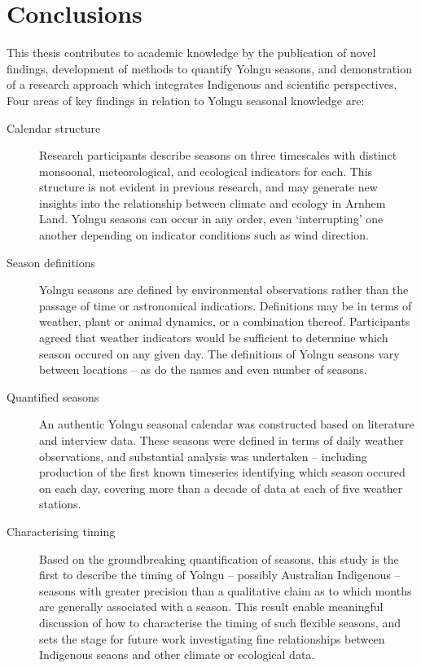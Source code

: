\chapter{Conclusions}
\label{ch:conclusion}

This thesis contributes to academic knowledge by the publication of novel
findings, development of methods to quantify Yolngu seasons, and demonstration
of a research approach which integrates Indigenous and scientific perspectives.
%
Four areas of key findings in relation to Yolngu seasonal knowledge are:

\begin{description}
\item[Calendar structure]
    Research participants describe seasons on three timescales with distinct
    monsoonal, meteorological, and ecological indicators for each.  This
    structure is not evident in previous research, and may generate new
    insights into the relationship between climate and ecology in Arnhem Land.
    Yolngu seasons can occur in any order, even `interrupting' one another
    depending on indicator conditions such as wind direction.

\item[Season definitions]
    Yolngu seasons are defined by environmental observations rather than the
    passage of time or astronomical indicatiors.  Definitions may be in terms
    of weather, plant or animal dynamics, or a combination thereof.
    Participants agreed that weather indicators would be sufficient to
    determine which season occured on any given day.  The definitions of
    Yolngu seasons vary between locations -- as do the names and even number
    of seasons.

\item[Quantified seasons]
    An authentic Yolngu seasonal calendar was constructed based on literature
    and interview data.  These seasons were defined in terms of daily weather
    observations, and substantial analysis was undertaken -- including
    production of the first known timeseries identifying which season occured
    on each day, covering more than a decade of data at each of five weather
    stations.

\item[Characterising timing]
    Based on the groundbreaking quantification of seasons, this study is the
    first to describe the timing of Yolngu -- possibly Australian Indigenous --
    seasons with greater precision than a qualitative claim as to which months
    are generally associated with a season.  This result enable meaningful
    discussion of how to characterise the timing of such flexible seasons,
    and sets the stage for future work investigating fine relationships between
    Indigenous seaons and other climate or ecological data.
\end{description}

